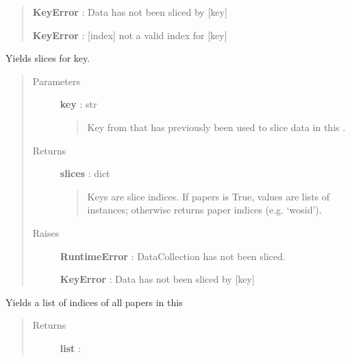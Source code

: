 \documentclass[letterpaper,10pt,english]{sphinxmanual}
\begin{document}
\begin{fulllineitems}
\begin{fulllineitems}
\begin{quote}
\begin{description}
\textbf{KeyError} : Data has not been sliced by {[}key{]}

\textbf{KeyError} : {[}index{]} not a valid index for {[}key{]}

\end{description}\end{quote}

\end{fulllineitems}


\begin{fulllineitems}
\label{tethne:tethne.data.DataCollection.get_slices}
Yields slices for key.
\begin{quote}\begin{description}
\item[{Parameters }] \leavevmode
\textbf{key} : str
\begin{quote}

Key from {\hyperref[tethne:tethne.data.Paper]{}} that has previously been used to slice data
in this {\hyperref[tethne:tethne.data.DataCollection]{}} .
\end{quote}

\item[{Returns }] \leavevmode
\textbf{slices} : dict
\begin{quote}

Keys are slice indices. If papers is True, values are lists of
{\hyperref[tethne:tethne.data.Paper]{}} instances; otherwise returns paper indices (e.g.
`wosid').
\end{quote}

\item[{Raises }] \leavevmode
\textbf{RuntimeError} : DataCollection has not been sliced.

\textbf{KeyError} : Data has not been sliced by {[}key{]}

\end{description}\end{quote}

\end{fulllineitems}


\begin{fulllineitems}
\label{tethne:tethne.data.DataCollection.indices}
Yields a list of indices of all papers in this {\hyperref[tethne:tethne.data.DataCollection]{}}
\begin{quote}\begin{description}
\item[{Returns }] \leavevmode
\textbf{list} :
\begin{quote}


\end{quote}
\end{description}
\end{quote}
\end{fulllineitems}
\end{fulllineitems}
\end{document}
